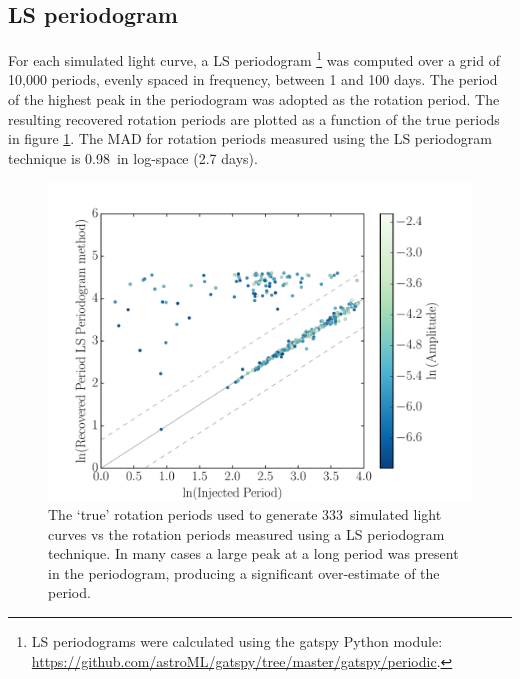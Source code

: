 \documentclass[useAMS, usenatbib, preprint, 12pt]{aastex}
\newcommand{\naigrain}{333}
\newcommand{\pgramRMS}{0.98}
\begin{document}
\subsection{LS periodogram}

For each simulated light curve, a LS periodogram
\footnote{LS periodograms were calculated using the gatspy Python module:
\url{https://github.com/astroML/gatspy/tree/master/gatspy/periodic}.}
was computed over a grid of 10,000 periods, evenly spaced in frequency,
between 1 and 100 days.
The period of the highest peak in the periodogram was adopted as the rotation
period.
The resulting recovered rotation periods are plotted as a function of the true
periods in figure \ref{fig:pgram_compare}.
The MAD for rotation periods measured using the LS periodogram technique is
\pgramRMS\ in log-space (2.7 days).

\begin{figure}
\begin{center}
\includegraphics[width=6in, clip=true]{figures/compare_pgram.pdf}
\caption[LS periodogram results.]
{The `true' rotation periods used to generate \naigrain\ simulated light
curves vs the rotation periods measured using a LS periodogram technique.
In many cases a large peak at a long period was present in the periodogram,
    producing a significant over-estimate of the period.
    }
\label{fig:pgram_compare}
\end{center}
\end{figure}
\end{document}
